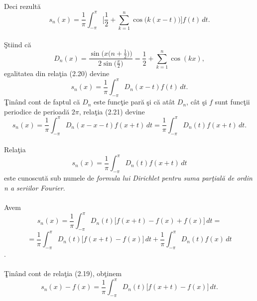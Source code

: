 \documentclass[a4paper,openany,12pt]{report}
\begin{document}
\paragraph*{}Deci rezult\u a
\begin{equation}
s_n(x) = \frac{1}{\pi}\int_{-\pi}^{\pi}\bigg[\frac{1}{2} + \sum_{k=1}^{n}\cos\big(k(x-t)\big)\bigg]f(t)\, dt.
\end{equation}
\paragraph*{}\c Stiind c\u a
\begin{equation*}D_n(x) = \frac{\sin\Big(x\big(n + \frac{1}{2}\big)\Big)}{2\sin\big(\frac{x}{2}\big)} = \frac{1}{2} + \sum_{k=1}^{n}\cos(kx),
\end{equation*}
egalitatea din rela\c tia (2.20) devine
\begin{equation}
s_n(x) =\frac{1}{\pi} \int_{-\pi}^{\pi} D_n(x-t) f(t)\, dt.
\end{equation}
\c Tin\^ and cont de faptul c\u a $D_n$ este func\c tie par\u a \c si c\u a at\^ at $D_n$, c\^ at \c si $f$ sunt func\c tii periodice de perioad\u a $2\pi$, rela\c tia (2.21) devine
\begin{equation*}
s_n(x) =\frac{1}{\pi} \int_{-\pi}^{\pi} D_n(x-x-t) f(x+t)\, dt = \frac{1}{\pi} \int_{-\pi}^{\pi} D_n(t) f(x+t)\, dt.
\end{equation*}
\paragraph*{}
Rela\c tia
\begin{equation*}
s_n(x) =  \frac{1}{\pi} \int_{-\pi}^{\pi} D_n(t) f(x+t)\, dt
\end{equation*}
este cunoscut\u a sub numele de \textit{formula lui Dirichlet pentru suma par\c tial\u a de ordin n a seriilor Fourier}.
\paragraph*{}Avem
\begin{equation*}
s_n(x) =  \frac{1}{\pi} \int_{-\pi}^{\pi} D_n(t) \big[f(x+t) -f(x) + f(x)\big]\, dt = 
\end{equation*}
\begin{equation*}
= \frac{1}{\pi} \int_{-\pi}^{\pi} D_n(t) \big[f(x+t) -f(x)\big]\, dt + \frac{1}{\pi} \int_{-\pi}^{\pi} D_n(t) f(x)\, dt
\end{equation*}.
\paragraph*{}\c Tin\^ and cont de rela\c tia (2.19), ob\c tinem
\begin{equation}
s_n(x) - f(x) = \frac{1}{\pi} \int_{-\pi}^{\pi} D_n(t) \big[f(x+t) -f(x)\big]\, dt .
\end{equation}
\end{document}
